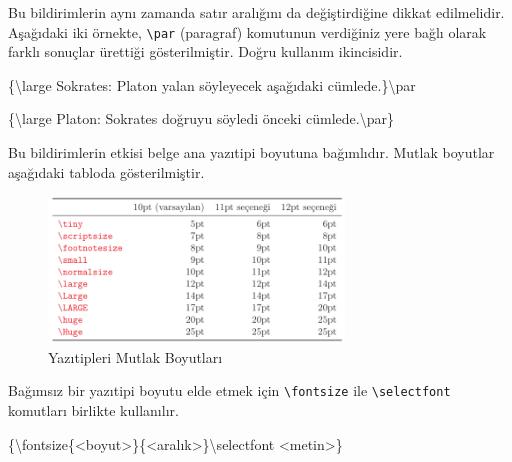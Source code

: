 \documentclass[
  10pt,
]{scrbook}
\newenvironment{Shaded}{\begin{snugshade}}{\end{snugshade}}
\newcommand{\FunctionTok}[1]{\textcolor[rgb]{0.00,0.00,0.00}{#1}}
\newcommand{\NormalTok}[1]{#1}
\theoremstyle{definition}
\theoremstyle{definition}
\theoremstyle{definition}
\theoremstyle{definition}
\theoremstyle{remark}
\begin{document}
Bu bildirimlerin aynı zamanda satır aralığını da değiştirdiğine dikkat edilmelidir. Aşağıdaki iki örnekte, \texttt{\textbackslash{}par} (paragraf) komutunun verdiğiniz yere bağlı olarak farklı sonuçlar ürettiği gösterilmiştir. Doğru kullanım ikincisidir.

\begin{Shaded}
\begin{Highlighting}[]
\NormalTok{\{}\FunctionTok{\textbackslash{}large} 
\NormalTok{Sokrates: Platon}
\NormalTok{yalan söyleyecek}
\NormalTok{aşağıdaki cümlede.\}}\FunctionTok{\textbackslash{}par}
\end{Highlighting}
\end{Shaded}

\begin{Shaded}
\begin{Highlighting}[]
\NormalTok{\{}\FunctionTok{\textbackslash{}large}\NormalTok{ Platon: Sokrates}
\NormalTok{doğruyu söyledi}
\NormalTok{önceki cümlede.}\FunctionTok{\textbackslash{}par}\NormalTok{\}}
\end{Highlighting}
\end{Shaded}

Bu bildirimlerin etkisi belge ana yazıtipi boyutuna bağımlıdır. Mutlak boyutlar aşağıdaki tabloda gösterilmiştir.

\begin{figure}
\centering
\includegraphics[width=0.7\textwidth,height=\textheight]{images/yazitipi9.png}
\caption{Yazıtipleri Mutlak Boyutları}
\end{figure}

Bağımsız bir yazıtipi boyutu elde etmek için \texttt{\textbackslash{}fontsize} ile \texttt{\textbackslash{}selectfont} komutları birlikte kullanılır.

\begin{Shaded}
\begin{Highlighting}[]
\NormalTok{\{}\FunctionTok{\textbackslash{}fontsize}\NormalTok{\{\textless{}boyut\textgreater{}\}\{\textless{}aralık\textgreater{}\}}\FunctionTok{\textbackslash{}selectfont}\NormalTok{ \textless{}metin\textgreater{}\}}
\end{Highlighting}
\end{Shaded}
\end{document}
